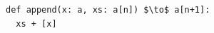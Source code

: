 \documentclass[border=10pt]{standalone}
\begin{document}
\begin{lstlisting}
def append(x: a, xs: a[n]) $\to$ a[n+1]:
  xs + [x]
\end{lstlisting}
\end{document}
